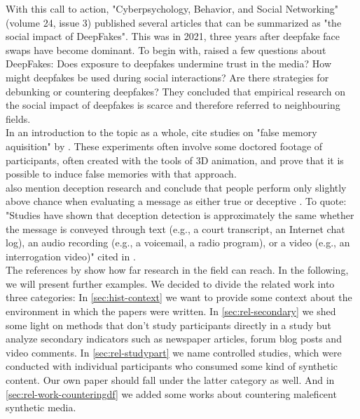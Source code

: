\documentclass[
  a4paper,  %
  twoside,  %
  bibliography=totoc,
  headsepline,
  cleardoublepage=empty,
  parskip=half,
  draft=false
]{scrbook}
\begin{document}
With this call to action, "Cyberpsychology, Behavior, and Social Networking" (volume 24, issue 3) published several articles that can be summarized as "the social impact of DeepFakes". This was in 2021, three years after deepfake face swaps have become dominant. To begin with, \citet{hancockSocialImpactDeepfakes2021} raised a few questions about DeepFakes: Does exposure to deepfakes undermine trust in the media? How might deepfakes be used during social interactions? Are there strategies for debunking or countering deepfakes? They concluded that empirical research on the social impact of deepfakes is scarce and therefore referred to neighbouring fields. \\
In an introduction to the topic as a whole, \citet{hancockSocialImpactDeepfakes2021} cite studies on "false memory aquisition" by \citet{garryActuallyPictureWorth2005}. These experiments often involve some doctored footage of participants, often created with the tools of 3D animation, and prove that it is possible to induce false memories with that approach. \\
\citet{hancockSocialImpactDeepfakes2021} also mention deception research and conclude that people perform only slightly above chance when evaluating a message as either true or deceptive \cite{bondAccuracyDeceptionJudgments2006}. To quote: "Studies have shown that deception detection is approximately the same whether the message is conveyed through text (e.g., a court transcript, an Internet chat log), an audio recording (e.g., a voicemail, a radio program), or a video (e.g., an interrogation video)" \cite{hancockSeeNoEvil2010} cited in \cite{hancockSocialImpactDeepfakes2021}. \\
The references by \citet{hancockSocialImpactDeepfakes2021} show how far research in the field can reach. In the following, we will present further examples. We decided to divide the related work into three categories: In \ref{sec:hist-context} we want to provide some context about the environment in which the papers were written. In \ref{sec:rel-secondary} we shed some light on methods that don't study participants directly in a study but analyze secondary indicators such as newspaper articles, forum blog posts and video comments. In \ref{sec:rel-studypart} we name controlled studies, which were conducted with individual participants who consumed some kind of synthetic content. Our own paper should fall under the latter category as well. And in \ref{sec:rel-work-counteringdf} we added some works about countering maleficent synthetic media.
\end{document}
